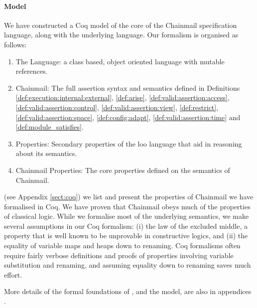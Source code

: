   





\paragraph{Model}

We have constructed a Coq model \cite{coq} of the core of the Chainmail
specification language, along with the underlying \LangOO language.
Our formalism is organised as follows:
\begin{enumerate}
\item
The \LangOO Language: a class based, object oriented language with mutable references.
\item
Chainmail: The full assertion syntax and semantics defined in Definitions \ref{def:execution:internal:external}, \ref{def:arise}, \ref{def:valid:assertion:access}, \ref{def:valid:assertion:control}, \ref{def:valid:assertion:view}, \ref{def:restrict}, \ref{def:valid:assertion:space}, \ref{def:config:adapt}, \ref{def:valid:assertion:time} and \ref{def:module_satisfies}.
\item
\LangOO Properties: Secondary properties of the loo language that aid in reasoning about its semantics.
\item
Chainmail Properties: The core properties defined on the semantics of Chainmail.
\end{enumerate}

 (see Appendix \ref{sect:coq}) we list and present the properties of Chainmail we have formalised in Coq.
We have proven that Chainmail obeys much of the properties of classical logic. While we formalise most of the underlying semantics, we make several assumptions in our Coq formalism: (i) the law of the excluded middle,  a property that is well known to be unprovable in constructive logics, and (ii) the equality of variable maps and heaps down to renaming. Coq formalisms often require fairly verbose definitions and proofs of properties involving variable substitution and renaming, and assuming equality down to renaming saves much effort.

More details of the formal foundations of \Chainmail, and the model,
are also in appendices \cite{examples}.

